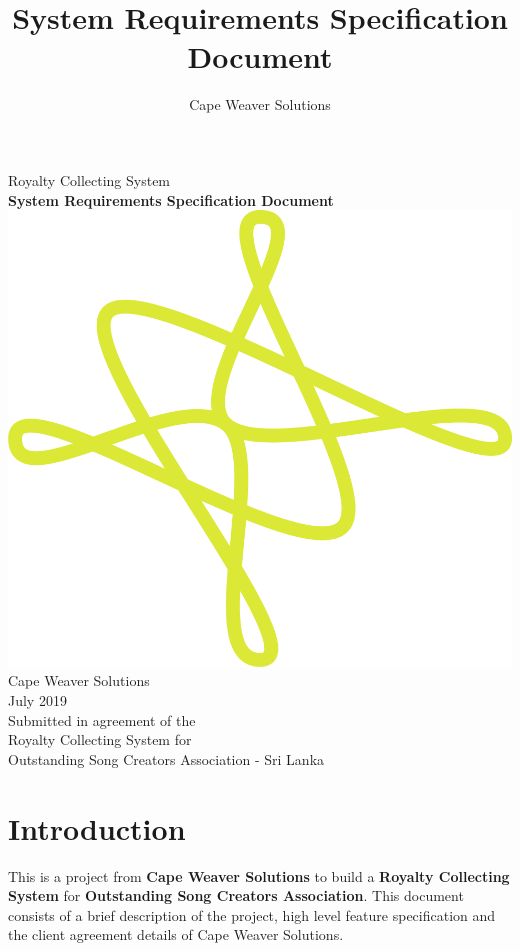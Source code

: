 \documentclass[12pt,a4paper]{article}
\title{System Requirements Specification Document}
\author{Cape Weaver Solutions}
\begin{document}
\begin{titlepage}    
    \center
    { \LARGE Royalty Collecting System}\\[0.5cm]
    { \LARGE \bfseries System Requirements Specification Document}\\[9.5cm]
    \includegraphics[scale=0.1]{logo}\\
    \Large Cape Weaver Solutions\\
    \Large July 2019\\[5cm]
    
    \small Submitted in agreement of the\\
    \small Royalty Collecting System for\\
    \small Outstanding Song Creators Association - Sri Lanka   
\end{titlepage}

\doublespacing
\renewcommand\contentsname{\center Table of Contents\\[1cm]}
\tableofcontents

\clearpage
\onehalfspacing
\section{Introduction}
\vspace{12pt}

This is a project from \textbf{Cape Weaver Solutions} to build a \textbf{Royalty Collecting System} for \textbf{Outstanding Song Creators Association}.
This document consists of a brief description of the project, high level feature specification and the client agreement details of
Cape Weaver Solutions.
\vspace{12pt}
\end{document}
